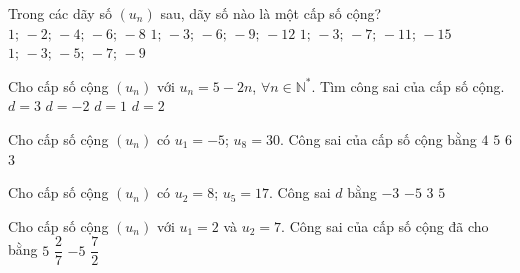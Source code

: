 \begin{ex}%
	Trong  các dãy số $(u_n)$ sau, dãy số nào là một cấp số cộng?
	 \choice
		{$1;  \,-2; \,-4; \,-6; \,-8$}
		{$1; \,-3; \,-6; \,-9;  \,-12$}
		{\True $1; \,-3; \,-7; \,-11; \,-15$} 
		 {$1; \,-3; \,-5; \,-7; \,-9$}
\end{ex}

\begin{ex}%
	Cho cấp số cộng $\left(u_n\right)$ với $u_n=5-2n$, $\forall  n \in \mathbb{N}^*$. Tìm công sai của cấp số cộng.
	 \choice
		 {$d=3$}
		{\True  $d=-2$}
		 {$d=1$}
		{$d=2$} 
\end{ex}

\begin{ex}%
	Cho cấp số cộng $(u_n)$ có $u_1=-5$; $u_8=30$. Công sai của cấp số cộng  bằng
	\choice 
		 {$4$}
		{\True $5$} 
		{$6$} 
		{$3$} 
\end{ex}

\begin{ex}%
	Cho cấp số cộng $(u_n)$ có $u_2=8$;  $u_5=17$. Công sai $d$ bằng
	\choice 
		 {$-3$}
		 {$-5$}
		{\True  $3$}
		{$5$} 
\end{ex}

\begin{ex}%
	Cho cấp số cộng $(u_n)$  với $u_1=2$ và $u_2=7$. Công sai của cấp số cộng đã cho bằng
	\choice 
		{\True$5$} 
		{$\dfrac{2}{7}$} 
		 {$-5$}
		{$\dfrac{7}{2}$} 
\end{ex}

